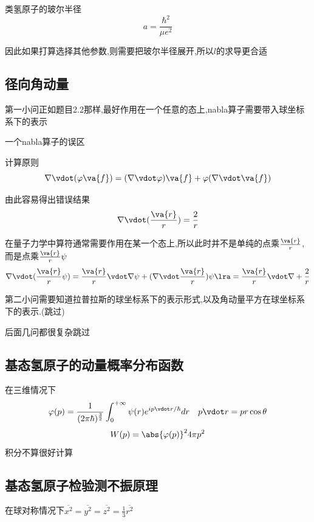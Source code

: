             \begin{formal}
                类氢原子的玻尔半径
                $$ a = \dfrac{\hbar^{2}}{\mu e^{2}} $$
            \end{formal}

            因此如果打算选择其他参数,则需要把玻尔半径展开,所以$l$的求导更合适

        \subsection{径向角动量}
            第一小问正如题目2.2那样,最好作用在一个任意的态上,nabla算子需要带入球坐标系下的表示

            \begin{formal}
                一个nabla算子的误区

                计算原则
                $$ \nabla \vdot (\varphi \va{f}) = (\nabla \vdot \varphi)\va{f} + \varphi(\nabla \vdot \va{f}) $$

                由此容易得出错误结果
                $$ \nabla \vdot (\frac{\va{r}}{r}) = \frac{2}{r} $$

                在量子力学中算符通常需要作用在某一个态上,所以此时并不是单纯的点乘$\frac{\va{r}}{r}$,而是点乘$\frac{\va{r}}{r}\psi$
                $$ 
                \nabla \vdot (\frac{\va{r}}{r} \psi) = \frac{\va{r}}{r} \vdot \nabla \psi +  (\nabla \vdot \frac{\va{r}}{r}) \psi \lra 
                = \frac{\va{r}}{r} \vdot \nabla + \frac{2}{r}
                $$
            \end{formal}

            第二小问需要知道拉普拉斯的球坐标系下的表示形式,以及角动量平方在球坐标系下的表示.(跳过)

            后面几问都很复杂跳过

        \subsection{基态氢原子的动量概率分布函数}
            在三维情况下
            $$ \varphi(p) = \dfrac{1}{(2\pi \hbar)^{\frac{3}{2}}} \int_{0}^{+\infty} \psi(r) e^{i p \vdot r/ \hbar} dr  \quad p \vdot r = p r \cos{\theta} $$
            $$ W(p) = \abs{\varphi(p)}^{2} 4\pi p^{2}  $$
            积分不算很好计算

        \subsection{基态氢原子检验测不振原理}
            在球对称情况下$\overline{x^{2}} = \overline{y^{2}} = \overline{z^{2}} = \frac{1}{3} \overline{r^{2}} $
            
